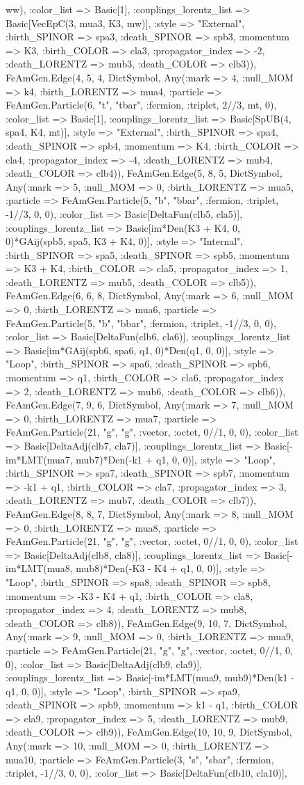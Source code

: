 \documentclass{revtex4}
\begin{document}
\begin{figure}[!htb]
\begin{center}
{ww), :color_list => Basic[1], :couplings_lorentz_list => Basic[VecEpC(3, mua3, K3, mw)], :style => "External", :birth_SPINOR => spa3, :death_SPINOR => spb3, :momentum => K3, :birth_COLOR => cla3, :propagator_index => -2, :death_LORENTZ => mub3, :death_COLOR => clb3)), FeAmGen.Edge(4, 5, 4, Dict{Symbol, Any}(:mark => 4, :null_MOM => k4, :birth_LORENTZ => mua4, :particle => FeAmGen.Particle(6, "t", "tbar", :fermion, :triplet, 2//3, mt, 0), :color_list => Basic[1], :couplings_lorentz_list => Basic[SpUB(4, spa4, K4, mt)], :style => "External", :birth_SPINOR => spa4, :death_SPINOR => spb4, :momentum => K4, :birth_COLOR => cla4, :propagator_index => -4, :death_LORENTZ => mub4, :death_COLOR => clb4)), FeAmGen.Edge(5, 8, 5, Dict{Symbol, Any}(:mark => 5, :null_MOM => 0, :birth_LORENTZ => mua5, :particle => FeAmGen.Particle(5, "b", "bbar", :fermion, :triplet, -1//3, 0, 0), :color_list => Basic[DeltaFun(clb5, cla5)], :couplings_lorentz_list => Basic[im*Den(K3 + K4, 0, 0)*GAij(spb5, spa5, K3 + K4, 0)], :style => "Internal", :birth_SPINOR => spa5, :death_SPINOR => spb5, :momentum => K3 + K4, :birth_COLOR => cla5, :propagator_index => 1, :death_LORENTZ => mub5, :death_COLOR => clb5)), FeAmGen.Edge(6, 6, 8, Dict{Symbol, Any}(:mark => 6, :null_MOM => 0, :birth_LORENTZ => mua6, :particle => FeAmGen.Particle(5, "b", "bbar", :fermion, :triplet, -1//3, 0, 0), :color_list => Basic[DeltaFun(clb6, cla6)], :couplings_lorentz_list => Basic[im*GAij(spb6, spa6, q1, 0)*Den(q1, 0, 0)], :style => "Loop", :birth_SPINOR => spa6, :death_SPINOR => spb6, :momentum => q1, :birth_COLOR => cla6, :propagator_index => 2, :death_LORENTZ => mub6, :death_COLOR => clb6)), FeAmGen.Edge(7, 9, 6, Dict{Symbol, Any}(:mark => 7, :null_MOM => 0, :birth_LORENTZ => mua7, :particle => FeAmGen.Particle(21, "g", "g", :vector, :octet, 0//1, 0, 0), :color_list => Basic[DeltaAdj(clb7, cla7)], :couplings_lorentz_list => Basic[-im*LMT(mua7, mub7)*Den(-k1 + q1, 0, 0)], :style => "Loop", :birth_SPINOR => spa7, :death_SPINOR => spb7, :momentum => -k1 + q1, :birth_COLOR => cla7, :propagator_index => 3, :death_LORENTZ => mub7, :death_COLOR => clb7)), FeAmGen.Edge(8, 8, 7, Dict{Symbol, Any}(:mark => 8, :null_MOM => 0, :birth_LORENTZ => mua8, :particle => FeAmGen.Particle(21, "g", "g", :vector, :octet, 0//1, 0, 0), :color_list => Basic[DeltaAdj(clb8, cla8)], :couplings_lorentz_list => Basic[-im*LMT(mua8, mub8)*Den(-K3 - K4 + q1, 0, 0)], :style => "Loop", :birth_SPINOR => spa8, :death_SPINOR => spb8, :momentum => -K3 - K4 + q1, :birth_COLOR => cla8, :propagator_index => 4, :death_LORENTZ => mub8, :death_COLOR => clb8)), FeAmGen.Edge(9, 10, 7, Dict{Symbol, Any}(:mark => 9, :null_MOM => 0, :birth_LORENTZ => mua9, :particle => FeAmGen.Particle(21, "g", "g", :vector, :octet, 0//1, 0, 0), :color_list => Basic[DeltaAdj(clb9, cla9)], :couplings_lorentz_list => Basic[-im*LMT(mua9, mub9)*Den(k1 - q1, 0, 0)], :style => "Loop", :birth_SPINOR => spa9, :death_SPINOR => spb9, :momentum => k1 - q1, :birth_COLOR => cla9, :propagator_index => 5, :death_LORENTZ => mub9, :death_COLOR => clb9)), FeAmGen.Edge(10, 10, 9, Dict{Symbol, Any}(:mark => 10, :null_MOM => 0, :birth_LORENTZ => mua10, :particle => FeAmGen.Particle(3, "s", "sbar", :fermion, :triplet, -1//3, 0, 0), :color_list => Basic[DeltaFun(clb10, cla10)], }
\end{center}
\end{figure}
\end{document}

